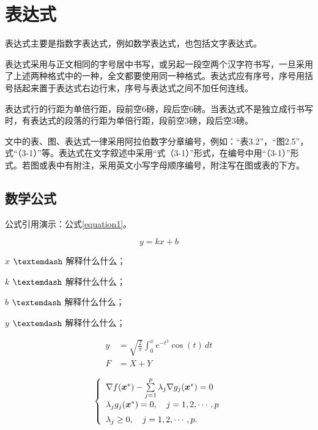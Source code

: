 \section{表达式}

表达式主要是指数字表达式，例如数学表达式，也包括文字表达式。

表达式采用与正文相同的字号居中书写，或另起一段空两个汉字符书写，一旦采用了上述两种格式中的一种，全文都要使用同一种格式。表达式应有序号，序号用括号括起来置于表达式右边行末，序号与表达式之间不加任何连线。

表达式行的行距为单倍行距，段前空6磅，段后空6磅。当表达式不是独立成行书写时，有表达式的段落的行距为单倍行距，段前空3磅，段后空3磅。

文中的表、图、表达式一律采用阿拉伯数字分章编号，例如：“表3.2”，“图2.5”，式“（3-1）”等。表达式在文字叙述中采用“式（3-1）”形式，在编号中用“（3-1）”形式。若图或表中有附注，采用英文小写字母顺序编号，附注写在图或表的下方。

\subsection{数学公式}

公式引用演示：公式\ref{equation1}。

\begin{equation}
	\label{equation1}
	y=kx+b
\end{equation}

\hspace{\ccwd} $x$ $\textemdash$ 解释什么什么；

\hspace{\ccwd} $k$ $\textemdash$ 解释什么什么；

\hspace{\ccwd} $b$ $\textemdash$ 解释什么什么；

\hspace{\ccwd} $y$ $\textemdash$ 解释什么什么；

\begin{align}
	y &= \sqrt{\frac{2}{\pi}} \int_{0}^{x} e^{-t^2}\cos(t) \, dt \\
	F &= X + Y
\end{align}

\begin{equation}
	\left\{\begin{array}{l}
		\nabla f({\mbox{\boldmath $x$}}^*)-\sum\limits_{j=1}^p\lambda_j\nabla g_j({\mbox{\boldmath $x$}}^*)=0\\[0.3cm]
		\lambda_jg_j({\mbox{\boldmath $x$}}^*)=0,\quad j=1,2,\cdots,p\\[0.2cm]
		\lambda_j\ge 0,\quad j=1,2,\cdots,p.
	\end{array}\right.
\end{equation}

